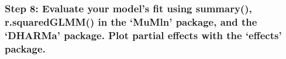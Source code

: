 \documentclass[]{article}
\begin{document}
\hypertarget{step-8-evaluate-your-models-fit-using-summary-r.squaredglmm-in-the-mumln-package-and-the-dharma-package.-plot-partial-effects-with-the-effects-package.}{%
\subsubsection{\texorpdfstring{Step 8: \textbf{Evaluate your model's fit
using summary(), r.squaredGLMM() in the `MuMln' package, and the
`DHARMa' package. Plot partial effects with the `effects'
package.}}{Step 8: Evaluate your model's fit using summary(), r.squaredGLMM() in the `MuMln' package, and the `DHARMa' package. Plot partial effects with the `effects' package.}}\label{step-8-evaluate-your-models-fit-using-summary-r.squaredglmm-in-the-mumln-package-and-the-dharma-package.-plot-partial-effects-with-the-effects-package.}}
\end{document}
